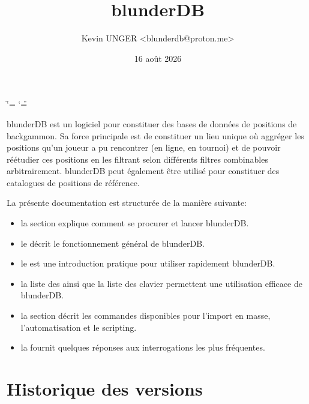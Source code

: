 \documentclass[letterpaper,10pt,french]{sphinxmanual}
\title{blunderDB}
\date{16 août 2026}
\author{Kevin UNGER <blunderdb@proton.me>}
\begin{document}
\ifdefined\shorthandoff
  \ifnum\catcode`\=\string=\active\shorthandoff{=}\fi
  \ifnum\catcode`\"=\active{}\fi
\fi

\pagestyle{empty}
\sphinxmaketitle
\pagestyle{plain}
\sphinxtableofcontents
\pagestyle{normal}
\label{\detokenize{index::doc}}


\sphinxAtStartPar
blunderDB est un logiciel pour constituer des bases de données de positions de
backgammon. Sa force principale est de constituer un lieu unique où aggréger
les positions qu’un joueur a pu rencontrer (en ligne, en tournoi) et de pouvoir
réétudier ces positions en les filtrant selon différents filtres combinables
arbitrairement. blunderDB peut également être utilisé pour constituer des
catalogues de positions de référence.

\sphinxAtStartPar
La présente documentation est structurée de la manière suivante:
\begin{itemize}
\item {} 
\sphinxAtStartPar
la section  explique comment se procurer et
lancer blunderDB.

\item {} 
\sphinxAtStartPar
le  décrit le fonctionnement général de blunderDB.

\item {} 
\sphinxAtStartPar
le  est une introduction pratique pour utiliser
rapidement blunderDB.

\item {} 
\sphinxAtStartPar
la liste des  ainsi que la liste des 
clavier permettent une utilisation efficace de blunderDB.

\item {} 
\sphinxAtStartPar
la section  décrit les commandes
disponibles pour l’import en masse, l’automatisation et le scripting.

\item {} 
\sphinxAtStartPar
la  fournit quelques réponses aux interrogations les plus fréquentes.

\end{itemize}


\chapter{Historique des versions}
\label{\detokenize{index:historique-des-versions}}
\end{document}

